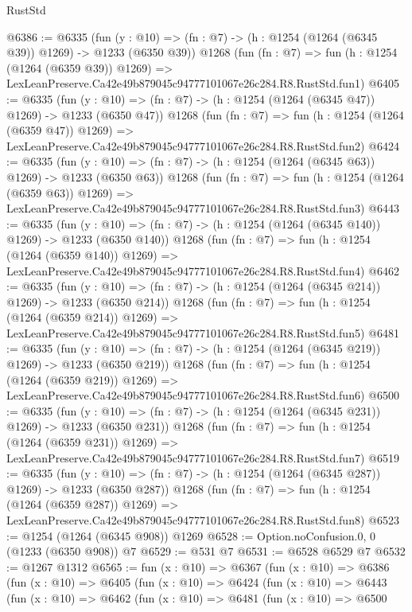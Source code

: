 \begin{lexlean}{RustStd}
\begin{coremodule}
@6386 := @6335
    (fun (y : @10) => (fn : @7) -> (h : @1254 (@1264 (@6345 @39)) @1269) -> @1233 (@6350 @39))
    @1268
    (fun (fn : @7) =>
    fun (h : @1254 (@1264 (@6359 @39)) @1269) =>
    LexLeanPreserve.Ca42e49b879045c94777101067e26c284.R8.RustStd.fun1)
@6405 := @6335
    (fun (y : @10) => (fn : @7) -> (h : @1254 (@1264 (@6345 @47)) @1269) -> @1233 (@6350 @47))
    @1268
    (fun (fn : @7) =>
    fun (h : @1254 (@1264 (@6359 @47)) @1269) =>
    LexLeanPreserve.Ca42e49b879045c94777101067e26c284.R8.RustStd.fun2)
@6424 := @6335
    (fun (y : @10) => (fn : @7) -> (h : @1254 (@1264 (@6345 @63)) @1269) -> @1233 (@6350 @63))
    @1268
    (fun (fn : @7) =>
    fun (h : @1254 (@1264 (@6359 @63)) @1269) =>
    LexLeanPreserve.Ca42e49b879045c94777101067e26c284.R8.RustStd.fun3)
@6443 := @6335
    (fun (y : @10) => (fn : @7) -> (h : @1254 (@1264 (@6345 @140)) @1269) -> @1233 (@6350 @140))
    @1268
    (fun (fn : @7) =>
    fun (h : @1254 (@1264 (@6359 @140)) @1269) =>
    LexLeanPreserve.Ca42e49b879045c94777101067e26c284.R8.RustStd.fun4)
@6462 := @6335
    (fun (y : @10) => (fn : @7) -> (h : @1254 (@1264 (@6345 @214)) @1269) -> @1233 (@6350 @214))
    @1268
    (fun (fn : @7) =>
    fun (h : @1254 (@1264 (@6359 @214)) @1269) =>
    LexLeanPreserve.Ca42e49b879045c94777101067e26c284.R8.RustStd.fun5)
@6481 := @6335
    (fun (y : @10) => (fn : @7) -> (h : @1254 (@1264 (@6345 @219)) @1269) -> @1233 (@6350 @219))
    @1268
    (fun (fn : @7) =>
    fun (h : @1254 (@1264 (@6359 @219)) @1269) =>
    LexLeanPreserve.Ca42e49b879045c94777101067e26c284.R8.RustStd.fun6)
@6500 := @6335
    (fun (y : @10) => (fn : @7) -> (h : @1254 (@1264 (@6345 @231)) @1269) -> @1233 (@6350 @231))
    @1268
    (fun (fn : @7) =>
    fun (h : @1254 (@1264 (@6359 @231)) @1269) =>
    LexLeanPreserve.Ca42e49b879045c94777101067e26c284.R8.RustStd.fun7)
@6519 := @6335
    (fun (y : @10) => (fn : @7) -> (h : @1254 (@1264 (@6345 @287)) @1269) -> @1233 (@6350 @287))
    @1268
    (fun (fn : @7) =>
    fun (h : @1254 (@1264 (@6359 @287)) @1269) =>
    LexLeanPreserve.Ca42e49b879045c94777101067e26c284.R8.RustStd.fun8)
@6523 := @1254 (@1264 (@6345 @908)) @1269
@6528 := Option.noConfusion.{0, 0} (@1233 (@6350 @908)) @7
@6529 := @531 @7
@6531 := @6528 @6529 @7
@6532 := @1267 @1312
@6565 := fun (x : @10) =>
  @6367
    (fun (x : @10) =>
    @6386
      (fun (x : @10) =>
      @6405
        (fun (x : @10) =>
        @6424
          (fun (x : @10) =>
          @6443
            (fun (x : @10) =>
            @6462
              (fun (x : @10) =>
              @6481
                (fun (x : @10) =>
                @6500

\end{coremodule}
\end{lexlean}
